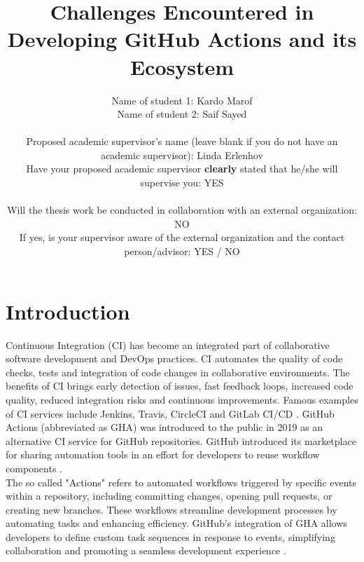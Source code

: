 \documentclass[conference]{IEEEtran}
\begin{document}
\title{Challenges Encountered in Developing GitHub Actions and its Ecosystem\\
}

\author{
\begin{tabular}{@{}ll}
Name of student 1: Kardo Marof \\
Name of student 2: Saif Sayed \\
\\
Proposed academic supervisor's name (leave blank if you do not have an academic supervisor): Linda Erlenhov \\
Have your proposed academic supervisor \textbf{clearly} stated that he/she will supervise you: YES \\
\\
Will the thesis work be conducted in collaboration with an external organization: NO \\
If yes, is your supervisor aware of the external organization and the contact person/advisor: YES / NO
\end{tabular}
}

\maketitle

\section{Introduction}
    Continuous Integration (CI) has become an integrated part of collaborative software development and DevOps practices. CI automates the quality of code checks, tests and integration of code changes in collaborative environments. The benefits of CI brings early detection of issues, fast feedback loops, increased code quality, reduced integration risks and continuous improvements. Famous examples of CI services include Jenkins, Travis, CircleCI and GitLab CI/CD \cite{dabbish2012social}. GitHub Actions (abbreviated as GHA) was introduced to the public in 2019 as an alternative CI service for GitHub repositories. GitHub introduced its marketplace for sharing automation tools in an effort for developers to reuse workflow components \cite{saroar2023developers}. \\ 

    The so called "Actions" refers to automated workflows triggered by specific events within a repository, including committing changes, opening pull requests, or creating new branches. These workflows streamline development processes by automating tasks and enhancing efficiency. GitHub's integration of GHA allows developers to define custom task sequences in response to events, simplifying collaboration and promoting a seamless development experience \cite{chandrasekara2021getting}. \\
\end{document}
